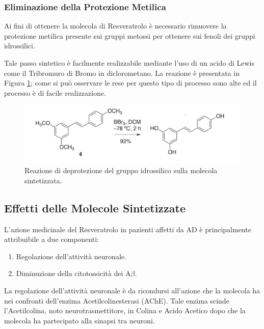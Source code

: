 \documentclass[a4paper, 12pt]{article}
\begin{document}
\subsubsection{Eliminazione della Protezione Metilica}
Ai fini di ottenere la molecola di Resveratrolo è necessario rimuovere la protezione metilica presente sui gruppi metossi per ottenere sui fenoli dei gruppi idrossilici.

Tale passo sintetico è facilmente realizzabile mediante l'uso di un acido di Lewis come il Tribromuro di Bromo in diclorometano. La reazione è presentata in Figura \ref{fig:deprot_resveratrolo}; come si può osservare le rese per questo tipo di processo sono alte ed il processo è di facile realizzazione. \autocite{alejandro_v._martinez_expedient_2017}

\begin{figure}[H]
	\centering
	\includegraphics[width=\linewidth]{immagini/deprot_resveratrolo.png}
	\caption{Reazione di deprotezione del gruppo idrossilico sulla molecola sintetizzata.}
	\label{fig:deprot_resveratrolo}
\end{figure}

\subsection{Effetti delle Molecole Sintetizzate}
\label{effetti_resveratrolo}
L'azione medicinale del Resveratrolo in pazienti affetti da AD è principalmente attribuibile a due componenti:

\begin{enumerate}
	\item Regolazione dell'attività neuronale.
	\item Diminuzione della citotossicità dei A\(\beta\).
\end{enumerate}

La regolazione dell'attività neuronale è da ricondursi all'azione che la molecola ha nei confronti dell'enzima Acetilcolinesterasi (AChE). Tale enzima scinde l'Acetilcolina, noto neurotrasmettitore, in Colina e Acido Acetico dopo che la molecola ha partecipato alla sinapsi tra neuroni.
\end{document}

